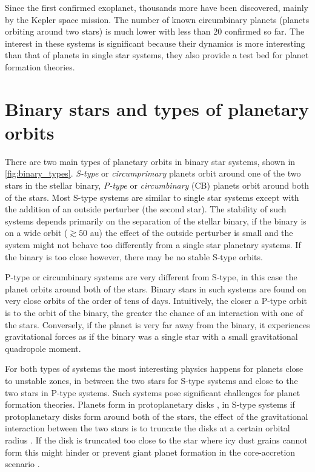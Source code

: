 \documentclass[twoside,openright,titlepage,numbers=noenddot,headinclude,%
                footinclude=true,cleardoublepage=empty,abstractoff, 
                BCOR=5mm,paper=a4,fontsize=11pt,%
                american,%
                ]{scrreprt}%
\begin{document}
 Since the first confirmed exoplanet, thousands more  have been discovered, 
 mainly by the Kepler space mission. The number of known circumbinary
 planets  (planets orbiting around two stars)
 is much lower with less than 20 confirmed so far. The interest in these systems
 is significant because their dynamics is more interesting than that of planets
 in single star systems, they also provide a test bed for planet formation 
 theories.
 
\section{Binary stars and types of planetary orbits}
\label{sec:Binary_stars_and_types_of_planetary_orbits}
There are two main types of planetary orbits in binary star systems, shown in
\cref{fig:binary_types}. \emph{S-type} or \emph{circumprimary} planets orbit
around one of the two stars in the stellar binary, \emph{P-type} or \emph{
    circumbinary} (CB) planets orbit around both of the stars. 
Most S-type systems
are similar to single star systems except with the addition of an outside 
perturber (the second star). The stability of such systems depends primarily 
on the separation of the stellar binary, if the binary is on a wide orbit
($\gtrsim 50$ au) the effect of the outside perturber is small and the system
might not behave too differently from a single star planetary systems. 
If the binary is too close  however, there may be no stable S-type orbits. 

P-type or circumbinary systems are very different from S-type, in this case 
the planet orbits around both of the stars. Binary stars in such systems
are found on very close orbits of the order of tens of days. Intuitively,
 the closer a P-type orbit is to the orbit of the binary, the greater the 
 chance of an interaction with one of the stars. Conversely, if the planet
 is very far away from the binary, it experiences gravitational forces 
 as if the binary was a single star with a small gravitational quadropole 
 moment. 

 For both types of systems the most interesting physics happens for planets
 close to unstable zones, in between the two stars for S-type systems and 
 close to the two stars in P-type systems. Such systems pose significant 
 challenges for planet formation theories. Planets form in protoplanetary
 disks \citep{armitage2010}, in S-type systems if protoplanetary disks form 
 around both of the stars, the effect of the gravitational interaction
 between the two stars is to truncate the disks at a certain orbital radius
 \citep{pichardo2005}. If the disk is truncated too close to the star where
 icy dust grains cannot form this might hinder or prevent giant planet
 formation in the core-accretion scenario \citet{Lissauer1993}.
\end{document}
